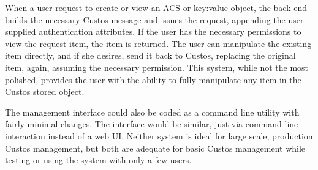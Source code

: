 When a user request to create or view an ACS or key:value object, the
back-end builds the necessary Custos message and issues the request,
appending the user supplied authentication attributes. If the user has
the necessary permissions to view the request item, the item is
returned. The user can manipulate the existing item directly, and if
she desires, send it back to Custos, replacing the original item,
again, assuming the necessary permission. This system, while not the
most polished, provides the user with the ability to fully manipulate
any item in the Custos stored object.

The management interface could also be coded as a command line utility
with fairly minimal changes. The interface would be similar, just via
command line interaction instead of a web UI. Neither system is ideal
for large scale, production Custos management, but both are adequate
for basic Custos management while testing or using the system with
only a few users.

